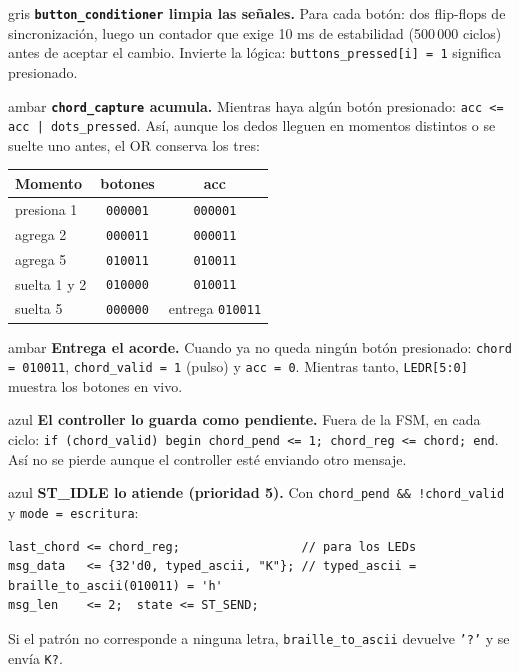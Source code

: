 \documentclass[11pt,a4paper]{article}
\newcommand{\cod}[1]{\texttt{#1}}
\begin{document}
\begin{paso}{gris}
\textbf{\cod{button\_conditioner} limpia las señales.} Para cada botón:
dos flip-flops de sincronización, luego un contador que exige 10 ms de estabilidad
(500\,000 ciclos) antes de aceptar el cambio. Invierte la lógica:
\cod{buttons\_pressed[i] = 1} significa presionado.
\end{paso}

\begin{paso}{ambar}
\textbf{\cod{chord\_capture} acumula.} Mientras haya algún botón
presionado: \cod{acc <= acc | dots\_pressed}. Así, aunque los dedos lleguen en
momentos distintos o se suelte uno antes, el OR conserva los tres:
\begin{center}
\begin{tabular}{lcc}
\toprule
\textbf{Momento} & \textbf{botones} & \textbf{acc} \\
\midrule
presiona 1 & \cod{000001} & \cod{000001} \\
agrega 2 & \cod{000011} & \cod{000011} \\
agrega 5 & \cod{010011} & \cod{010011} \\
suelta 1 y 2 & \cod{010000} & \cod{010011} \\
suelta 5 & \cod{000000} & entrega \cod{010011} \\
\bottomrule
\end{tabular}
\end{center}
\end{paso}

\begin{paso}{ambar}
\textbf{Entrega el acorde.} Cuando ya no queda ningún botón presionado:
\cod{chord = 010011}, \cod{chord\_valid = 1} (pulso) y \cod{acc = 0}. Mientras tanto,
\cod{LEDR[5:0]} muestra los botones en vivo.
\end{paso}

\begin{paso}{azul}
\textbf{El controller lo guarda como pendiente.} Fuera de la FSM, en
cada ciclo: \cod{if (chord\_valid) begin chord\_pend <= 1; chord\_reg <= chord; end}.
Así no se pierde aunque el controller esté enviando otro mensaje.
\end{paso}

\begin{paso}{azul}
\textbf{ST\_IDLE lo atiende (prioridad 5).} Con
\cod{chord\_pend \&\& !chord\_valid} y \cod{mode = escritura}:
\begin{lstlisting}
last_chord <= chord_reg;                 // para los LEDs
msg_data   <= {32'd0, typed_ascii, "K"}; // typed_ascii = braille_to_ascii(010011) = 'h'
msg_len    <= 2;  state <= ST_SEND;
\end{lstlisting}
Si el patrón no corresponde a ninguna letra, \cod{braille\_to\_ascii} devuelve
\cod{'?'} y se envía \cod{K?}.
\end{paso}
\end{document}

